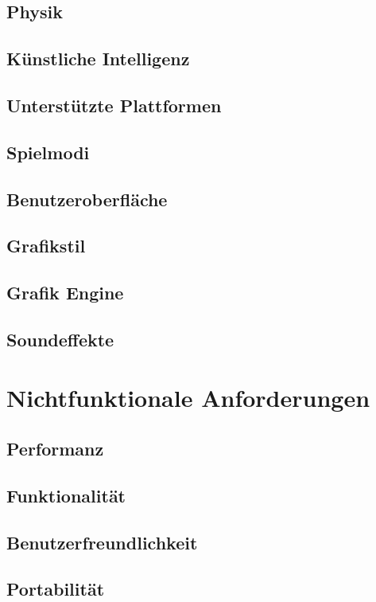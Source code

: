 \documentclass[11pt,ngerman]{article}
\begin{document}
        \subsection{Physik}
        \subsection{Künstliche Intelligenz}
        \subsection{Unterstützte Plattformen}
        \subsection{Spielmodi}
        \subsection{Benutzeroberfläche}
        \subsection{Grafikstil}
        \subsection{Grafik Engine}
        \subsection{Soundeffekte}

    \section{Nichtfunktionale Anforderungen}

        \subsection{Performanz}
        \subsection{Funktionalität}
        \subsection{Benutzerfreundlichkeit}
        \subsection{Portabilität}
\end{document}
